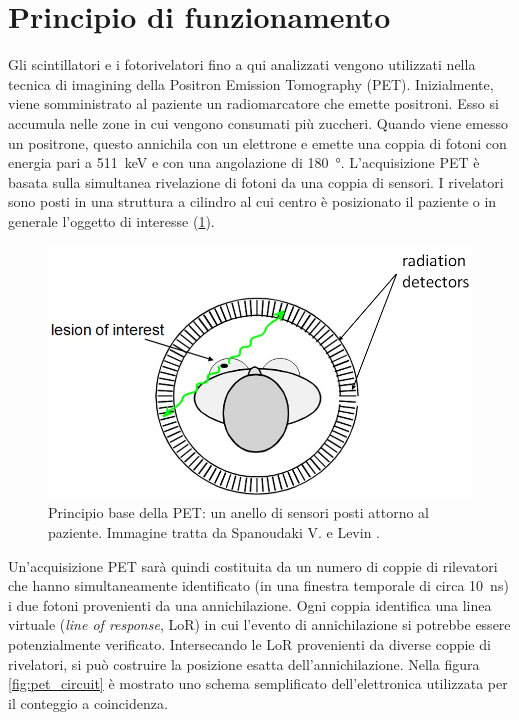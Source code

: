 \section{Principio di funzionamento}
Gli scintillatori e i fotorivelatori fino a qui analizzati vengono utilizzati nella tecnica di imagining della Positron Emission Tomography (PET). Inizialmente, viene somministrato al paziente un radiomarcatore che emette positroni. Esso si accumula nelle zone in cui vengono consumati più zuccheri. Quando viene emesso un positrone, questo annichila con un elettrone e emette una coppia di fotoni con energia pari a \SI{511}{\kilo\electronvolt} e con una angolazione di \SI{180}{\degree}. L'acquisizione PET è basata sulla simultanea rivelazione di fotoni da una coppia di sensori. I rivelatori sono posti in una struttura a cilindro al cui centro è posizionato il paziente o in generale l'oggetto di interesse (\Fig\ref{fig:pet}).
\begin{figure}[b!]
	\centering
	\includegraphics[width=0.7\linewidth]{./ImageFiles/PET.jpg}
	\caption{Principio base della PET: un anello di sensori posti attorno al paziente. Immagine tratta da Spanoudaki V. e Levin \cite{Spanoudaki2010}.}
	\label{fig:pet}
\end{figure} 
Un'acquisizione PET sarà quindi costituita da un numero di coppie di rilevatori che hanno simultaneamente identificato (in una finestra temporale di circa \SI{10}{\nano\second}) i due fotoni provenienti da una annichilazione. Ogni coppia identifica una linea virtuale (\textit{line of response}, LoR) in cui l'evento di annichilazione si potrebbe essere potenzialmente verificato. Intersecando le LoR provenienti da diverse coppie di rivelatori, si può costruire la posizione esatta dell'annichilazione. Nella figura \ref{fig:pet_circuit} è mostrato uno schema semplificato dell'elettronica utilizzata per il conteggio a coincidenza.
